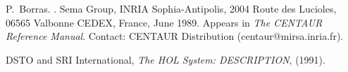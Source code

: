 
\begin{thebibliography}{1}

P.~Borras.
.
\newblock Sema Group, INRIA Sophia-Antipolis, 2004 Route des Lucioles, 06565
  Valbonne CEDEX, France, June 1989.
\newblock Appears in {\it The CENTAUR Reference Manual}. Contact: CENTAUR
  Distribution (centaur@mirsa.inria.fr).

{\small DSTO} and {\small SRI} International, 
{\it The HOL System: DESCRIPTION}, (1991).

\end{thebibliography}



